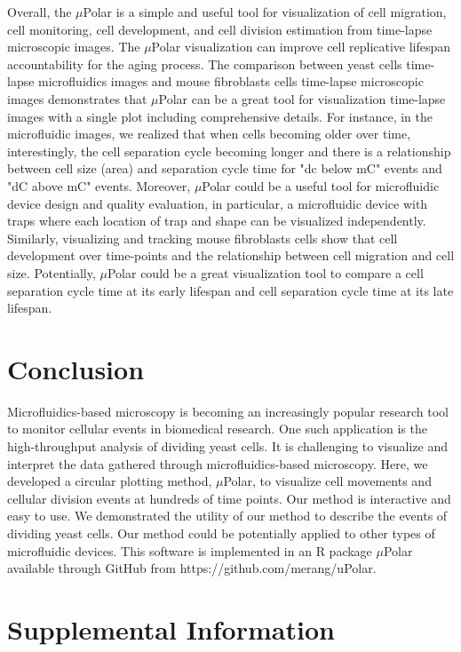 \documentclass[conference]{IEEEtran}
\begin{document}
Overall, the $\mu$Polar is a simple and useful tool for visualization of cell migration, cell monitoring, cell development, and cell division estimation from time-lapse microscopic images.
The $\mu$Polar visualization can improve cell replicative lifespan accountability for the aging process. The comparison between yeast cells time-lapse microfluidics images and mouse fibroblasts cells time-lapse microscopic images demonstrates that $\mu$Polar can be a great tool for visualization time-lapse images with a single plot including comprehensive details. For instance, in the microfluidic images, we realized that when cells becoming older over time, interestingly, the cell separation cycle becoming longer and there is a relationship between cell size (area) and separation cycle time for "dc below mC" events and "dC above mC" events. Moreover, $\mu$Polar could be a useful tool for microfluidic device design and quality evaluation, in particular, a microfluidic device with traps where each location of trap and shape can be visualized independently. Similarly, visualizing and tracking mouse fibroblasts cells show that cell development over time-points and the relationship between cell migration and cell size. Potentially, $\mu$Polar could be a great visualization tool to compare a cell separation cycle time at its early lifespan and cell separation cycle time at its late lifespan.


\section{Conclusion}
Microfluidics-based microscopy is becoming an increasingly popular research tool to monitor cellular events in biomedical research. One such application is the high-throughput analysis of dividing yeast cells. It is challenging to visualize and interpret the data gathered through microfluidics-based microscopy. Here, we developed a circular plotting method, $\mu$Polar, to visualize cell movements and cellular division events at hundreds of time points. Our method is interactive and easy to use. We demonstrated the utility of our method to describe the events of dividing yeast cells. Our method could be potentially applied to other types of microfluidic devices. This software is implemented in an R package $\mu$Polar available through GitHub from https://github.com/merang/uPolar.

\section{Supplemental Information}
\end{document}
